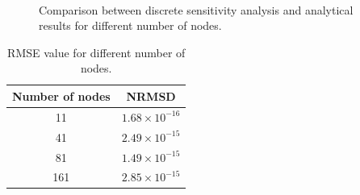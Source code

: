 \begin{figure}[H]
	\centering
	\quad
	\\
	\quad
	\caption{Comparison between discrete sensitivity analysis and analytical results for different number of nodes.}
	\label{fig:C2_discreteSensitivityVerification}
\end{figure}

\begin{table}[H]
\centering
\begin{tabular}{| c | c |}
	\hline
	Number of nodes & NRMSD \\ \hline \hline
	11 & $1.68 \times 10^{-16}$ \\ \hline
	41 & $2.49 \times 10^{-15}$ \\ \hline
	81 & $1.49 \times 10^{-15}$ \\ \hline
	161 & $2.85 \times 10^{-15}$ \\ \hline
\end{tabular}
\caption{RMSE value for different number of nodes.}
\label{table:C2_DSA_NRMSD}
\end{table}

